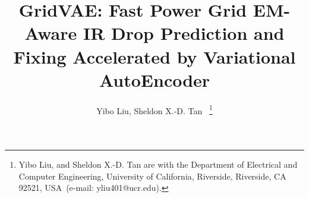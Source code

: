 \documentclass[journal]{IEEEtran}
\begin{document}
\title{GridVAE: Fast Power Grid EM-Aware IR Drop Prediction and Fixing
  Accelerated by Variational AutoEncoder}

\author{\indent Yibo Liu,  Sheldon X.-D. Tan
~\thanks{\indent Yibo Liu, and Sheldon X.-D. Tan are with the Department of Electrical and Computer Engineering, University of California, Riverside, Riverside, CA 92521, USA~(e-mail: yliu401@ucr.edu).}}


\maketitle
  
\begin{abstract}



\end{abstract}
\end{document}
